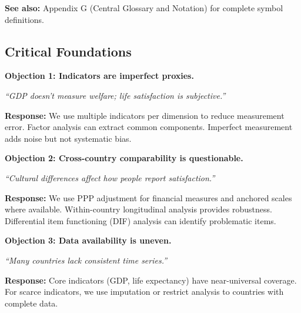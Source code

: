 \textbf{See also:} Appendix G (Central Glossary and Notation) for complete symbol definitions.


\subsection{Critical Foundations}
\label{sec:E-foundations}

\begin{tcolorbox}[colback=red!5!white, colframe=red!75!black,
    title=\textbf{Critical Foundations: Objections and Responses}]

\textbf{Objection 1: Indicators are imperfect proxies.}

\textit{``GDP doesn't measure welfare; life satisfaction is subjective.''}

\textbf{Response:} We use multiple indicators per dimension to reduce
measurement error. Factor analysis can extract common components.
Imperfect measurement adds noise but not systematic bias.

\medskip

\textbf{Objection 2: Cross-country comparability is questionable.}

\textit{``Cultural differences affect how people report satisfaction.''}

\textbf{Response:} We use PPP adjustment for financial measures and
anchored scales where available. Within-country longitudinal analysis
provides robustness. Differential item functioning (DIF) analysis
can identify problematic items.

\medskip

\textbf{Objection 3: Data availability is uneven.}

\textit{``Many countries lack consistent time series.''}

\textbf{Response:} Core indicators (GDP, life expectancy) have near-universal
coverage. For scarce indicators, we use imputation or restrict analysis
to countries with complete data.

\end{tcolorbox}



